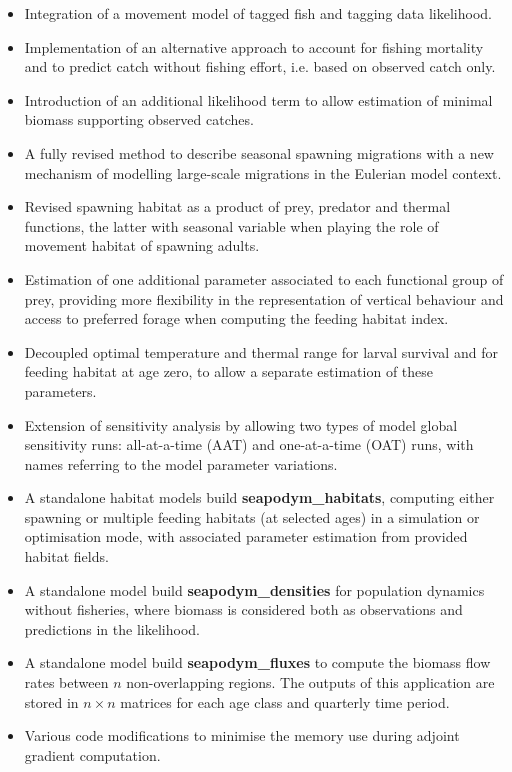 \documentclass[a4paper,12pt,twoside]{book}
\begin{document}
\begin{itemize}
\item Integration of a movement model of tagged fish and tagging data likelihood.
\item Implementation of an alternative approach to account for fishing mortality and to
predict catch without fishing effort, i.e. based on observed catch only.
\item Introduction of an additional likelihood term to allow estimation of minimal biomass supporting observed catches.
\item A fully revised method to describe seasonal spawning migrations with a new mechanism of modelling large-scale migrations in the Eulerian model context.
\item Revised spawning habitat as a product of prey, predator and thermal functions, 
the latter with seasonal variable when playing the role of movement habitat of spawning adults.
\item Estimation of one additional parameter associated to each functional group of prey,
providing more flexibility in the representation of vertical behaviour and
access to preferred forage when computing the feeding habitat index.
\item Decoupled optimal temperature and thermal range for larval survival and for feeding habitat at age zero, to allow a separate estimation of these parameters.
\item Extension of sensitivity analysis by allowing two types of model global sensitivity runs: all-at-a-time (AAT) and one-at-a-time (OAT) runs, with names referring to the model parameter variations.
\item A standalone habitat models build {\bfseries seapodym\_habitats}, computing either spawning or multiple feeding habitats (at selected ages) in a simulation or optimisation mode, with associated parameter estimation from provided habitat fields.
\item A standalone model build {\bfseries seapodym\_densities} for population dynamics without fisheries, where biomass is considered both as observations and predictions in the likelihood.
\item A standalone model build {\bfseries seapodym\_fluxes} to compute the biomass flow rates between $n$ non-overlapping regions. The outputs of this application are stored in $n \times n$ matrices for each age class and quarterly time period.
\item Various code modifications to minimise the memory use during adjoint gradient computation.

\end{itemize}

\clearpage

{
  \hypersetup{linkcolor=black}
  \tableofcontents
}

\clearpage









%

\clearpage
\end{document}
